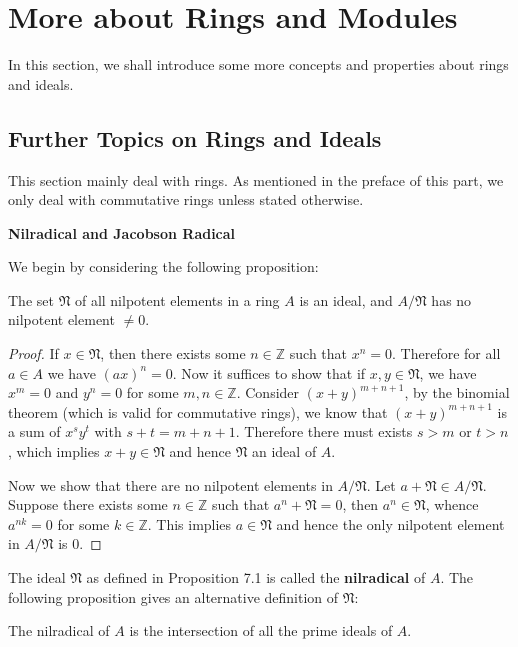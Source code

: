 \section{More about Rings and Modules}
In this section, we shall introduce some more concepts and properties about rings and ideals.
\subsection{Further Topics on Rings and Ideals}
This section mainly deal with rings. As mentioned in the preface of this part, we only deal with commutative rings unless stated otherwise.
\begin{center}
\begin{large}
    \textbf{Nilradical and Jacobson Radical}
\end{large}
\end{center}
We begin by considering the following proposition: 
\begin{proposition}
The set $\mathfrak{N}$ of all nilpotent elements in a ring $A$ is an ideal, and $A/\mathfrak{N}$ has no nilpotent element $\ne 0$.
\end{proposition}
\begin{proof}
If $x\in\mathfrak{N}$, then there exists some $n\in\mathbb{Z}$ such that $x^n=0$. Therefore for all $a\in A$ we have $(ax)^n=0$. Now it suffices to show that if $x,y\in\mathfrak{N}$, we have $x^m=0$ and $y^n=0$ for some $m,n\in\mathbb{Z}$. Consider $(x+y)^{m+n+1}$, by the binomial theorem (which is valid for commutative rings), we know that $(x+y)^{m+n+1}$ is a sum of $x^sy^t$ with $s+t=m+n+1$. Therefore there must exists $s>m$ or $t>n$, which implies $x+y\in\mathfrak{N}$ and hence $\mathfrak{N}$ an ideal of $A$.\par
Now we show that there are no nilpotent elements in $A/\mathfrak{N}$. Let $a+\mathfrak{N}\in A/\mathfrak{N}$. Suppose there exists some $n\in\mathbb{Z}$ such that $a^n+\mathfrak{N}=0$, then $a^n\in\mathfrak{N}$, whence $a^{nk}=0$ for some $k\in\mathbb{Z}$. This implies $a\in\mathfrak{N}$ and hence the only nilpotent element in $A/\mathfrak{N}$ is $0$.
\end{proof}
The ideal $\mathfrak{N}$ as defined in Proposition 7.1 is called the \textbf{nilradical} of $A$. The following proposition gives an alternative definition of $\mathfrak{N}$:
\begin{proposition}
The nilradical of $A$ is the intersection of all the prime ideals of $A$.
\end{proposition}
